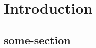 \documentclass[thesis.tex]{subfiles}
\begin{document}
\chapter{Introduction}


\section{some-section}

\end{document}
